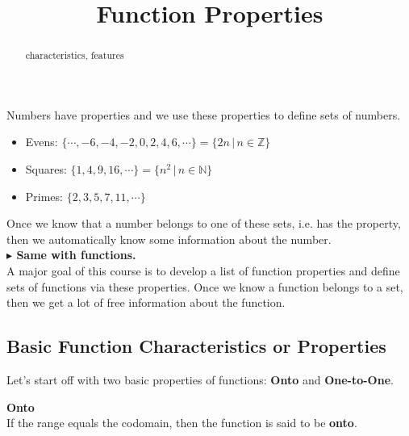 \documentclass{ximera}
\title{Function Properties}
\begin{document}
\begin{abstract}
characteristics, features
\end{abstract}
\maketitle





Numbers have properties and we use these properties to define sets of numbers. \\



\begin{itemize}
\item Evens:  $\{ \cdots, -6, -4, -2, 0, 2, 4, 6, \cdots \} = \{ 2n   \, | \, n \in \mathbb{Z} \}$
\item Squares:  $\{ 1, 4, 9, 16, \cdots \} = \{ n^2   \, | \, n \in \mathbb{N} \}$
\item Primes:  $\{ 2, 3, 5, 7, 11,  \cdots \}$
\end{itemize}

Once we know that a number belongs to one of these sets, i.e. has the property, then we automatically know some information about the number. \\


\textbf{\textcolor{red!90!darkgray}{$\blacktriangleright$ Same with functions.}}  \\



A major goal of this course is to develop a list of function properties and define sets of functions via these properties.  Once we know a function belongs to a set, then we get a lot of free information about the function. \\









\subsection*{Basic Function Characteristics or Properties}


Let's start off with two basic properties of functions: \textbf{Onto} and \textbf{One-to-One}.







\begin{definition} \textbf{\textcolor{green!50!black}{Onto}} \\

If the range equals the codomain, then the function is said to be \textbf{onto}.

\end{definition}
\end{document}
